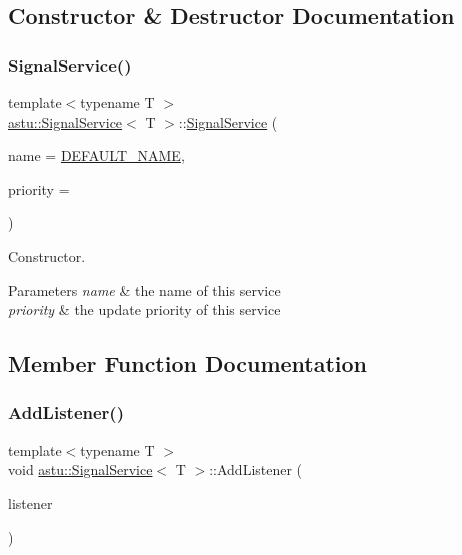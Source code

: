 \subsection{Constructor \& Destructor Documentation}
\mbox{\label{classastu_1_1SignalService_acf4e3bfbacc9eb6654a84d59b3ff1a6a}} 
\subsubsection{\texorpdfstring{Signal\+Service()}{SignalService()}}
{\footnotesize\ttfamily template$<$typename T $>$ \\
\hyperlink{classastu_1_1SignalService}{astu\+::\+Signal\+Service}$<$ T $>$\+::\hyperlink{classastu_1_1SignalService}{Signal\+Service} (\begin{DoxyParamCaption}\item[{const std\+::string \&}]{name = {\ttfamily \hyperlink{classastu_1_1BaseService_a9483b26ad631bd14646ef2d2170cd828}{D\+E\+F\+A\+U\+L\+T\+\_\+\+N\+A\+ME}},  }\item[{int}]{priority = {} }\end{DoxyParamCaption})\hspace{0.3cm}{\ttfamily [inline]}}

Constructor.


\begin{DoxyParams}{Parameters}
{\em name} & the name of this service \\
\hline
{\em priority} & the update priority of this service \\
\hline
\end{DoxyParams}


\subsection{Member Function Documentation}
\mbox{\label{classastu_1_1SignalService_a9027644028616eb9bad00447648cae29}} 
\subsubsection{\texorpdfstring{Add\+Listener()}{AddListener()}}
{\footnotesize\ttfamily template$<$typename T $>$ \\
void \hyperlink{classastu_1_1SignalService}{astu\+::\+Signal\+Service}$<$ T $>$\+::Add\+Listener (\begin{DoxyParamCaption}\item[{const std\+::shared\+\_\+ptr$<$ \hyperlink{classastu_1_1ISignalListener}{I\+Signal\+Listener}$<$ T $>$$>$ \&}]{listener }\end{DoxyParamCaption})\hspace{0.3cm}{\ttfamily [inline]}}


